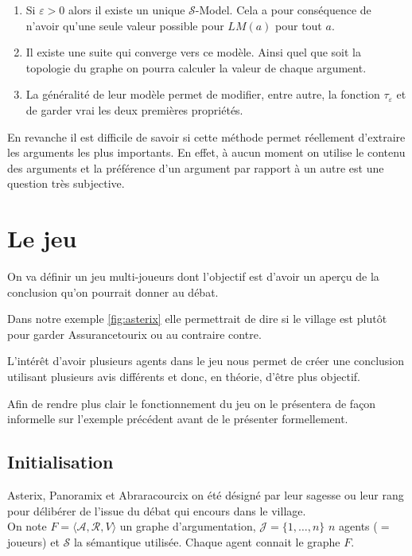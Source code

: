 \documentclass[11pt]{article}
\theoremstyle{defi}
\theoremstyle{not}
\theoremstyle{prob}
\begin{document}
      \begin{enumerate}
        \item Si $\varepsilon > 0$ alors il existe un unique $\mathcal{S}$-Model. Cela a pour conséquence de n'avoir qu'une seule valeur possible pour $LM(a)$ pour tout $a$.
        \item Il existe une suite qui converge vers ce modèle. %
        Ainsi quel que soit la topologie du graphe on pourra calculer la valeur de chaque argument.
        \item La généralité de leur modèle permet de modifier, entre autre, la fonction $\tau_\varepsilon$ et de garder vrai les deux premières propriétés.
      \end{enumerate}

      En revanche il est difficile de savoir si cette méthode permet réellement d'extraire les arguments les plus importants. En effet, à aucun moment on utilise le contenu des arguments et la préférence d'un argument par rapport à un autre est une question très subjective.

  \section{Le jeu}
    On va définir un jeu multi-joueurs dont l'objectif est d'avoir un aperçu de la conclusion qu'on pourrait donner au débat.

    Dans notre exemple \ref{fig:asterix} elle permettrait de dire si le village est plutôt pour garder Assurancetourix ou au contraire contre.

    L'intérêt d'avoir plusieurs agents dans le jeu nous permet de créer une conclusion utilisant plusieurs avis différents et donc, en théorie, d'être plus objectif.

    Afin de rendre plus clair le fonctionnement du jeu on le présentera de façon informelle sur l'exemple précédent avant de le présenter formellement.

    \subsection{Initialisation}

      Asterix, Panoramix et Abraracourcix on été désigné par leur sagesse ou leur rang pour délibérer de l'issue du débat qui encours dans le village.\\

      On note $F = \langle \mathcal{A}, \mathcal{R}, V \rangle$ un graphe d'argumentation, $\mathcal{J} = \{1, \ldots, n\}$ $n$ agents ($=$ joueurs) et $\mathcal{S}$ la sémantique utilisée.
      Chaque agent connait le graphe $F$.\\
\end{document}
